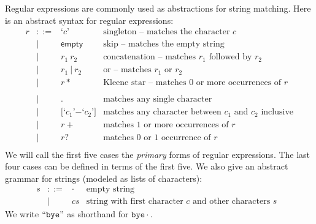 \documentclass[12pt]{exam}
\newcommand{\rechar}[1]{\ensuremath{\texttt{`}#1\texttt{'}}}
\begin{document}
Regular expressions are
commonly used as abstractions for string matching. Here is an abstract
syntax for regular expressions:
\[
\begin{array}{rcll}
r & ::= & \rechar{c}  & \mbox{singleton -- matches the character $c$} \\
  & |   & \mathsf{empty} & \mbox{skip -- matches the empty string} \\
  & |   & r_1~r_2        & \mbox{concatenation -- matches $r_1$ followed by
  $r_2$ } \\
  & |   & r_1~|~r_2      & \mbox{or -- matches $r_1$ or $r_2$ } \\
  & |   & r *            & \mbox{Kleene star -- matches 0 or more occurrences of $r$ } \\
  \\

  & |   & \mathtt{.}     & \mbox{matches any single character} \\
  & |   & \mathtt{[}\rechar{c_1} \mathtt{-}\rechar{c_2}\mathtt{]}
  & \mbox{matches any character between $c_1$ and $c_2$ inclusive} \\
  & |   & r +            & \mbox{matches 1 or more occurrences of $r$ } \\
  & |   & r ?            & \mbox{matches 0 or 1 occurrence of $r$ } \\
\end{array}
\]
We will call the first five cases the \emph{primary} forms of regular
expressions. The last four cases can be defined in terms of the first five.
We also give an abstract grammar for strings (modeled as lists of
characters): 
\[
\begin{array}{rcll}
s & ::= & \cdot       & \mbox{empty string} \\
  &   | & c s  & \mbox{string with first character $c$ and
  other characters $s$ } 
\end{array}
\]
We write $\mathtt{``bye"}$ as shorthand for $\mathtt{b}
\mathtt{y} \mathtt{e} \cdot$. 
\end{document}
